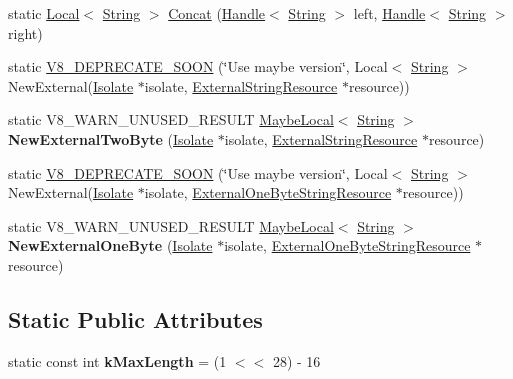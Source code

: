 \begin{DoxyCompactItemize}
\item 
static \hyperlink{classv8_1_1_local}{Local}$<$ \hyperlink{classv8_1_1_string}{String} $>$ \hyperlink{classv8_1_1_string_a3d0b9c9208cf5054adb048e360fb73ff}{Concat} (\hyperlink{classv8_1_1_local}{Handle}$<$ \hyperlink{classv8_1_1_string}{String} $>$ left, \hyperlink{classv8_1_1_local}{Handle}$<$ \hyperlink{classv8_1_1_string}{String} $>$ right)
\item 
static \hyperlink{classv8_1_1_string_affb615b7b4aad75d51d60ed1672a6762}{V8\+\_\+\+D\+E\+P\+R\+E\+C\+A\+T\+E\+\_\+\+S\+O\+O\+N} (\char`\"{}Use maybe version\char`\"{}, Local$<$ \hyperlink{classv8_1_1_string}{String} $>$ New\+External(\hyperlink{classv8_1_1_isolate}{Isolate} $\ast$isolate, \hyperlink{classv8_1_1_string_1_1_external_string_resource}{External\+String\+Resource} $\ast$resource))
\item 
\hypertarget{classv8_1_1_string_ad0491e4a3506df9ef9bfc08fca0d7a34}{}static V8\+\_\+\+W\+A\+R\+N\+\_\+\+U\+N\+U\+S\+E\+D\+\_\+\+R\+E\+S\+U\+L\+T \hyperlink{classv8_1_1_maybe_local}{Maybe\+Local}$<$ \hyperlink{classv8_1_1_string}{String} $>$ {\bfseries New\+External\+Two\+Byte} (\hyperlink{classv8_1_1_isolate}{Isolate} $\ast$isolate, \hyperlink{classv8_1_1_string_1_1_external_string_resource}{External\+String\+Resource} $\ast$resource)\label{classv8_1_1_string_ad0491e4a3506df9ef9bfc08fca0d7a34}

\item 
static \hyperlink{classv8_1_1_string_ad7186b5cfdddffbee8235a7216f31a67}{V8\+\_\+\+D\+E\+P\+R\+E\+C\+A\+T\+E\+\_\+\+S\+O\+O\+N} (\char`\"{}Use maybe version\char`\"{}, Local$<$ \hyperlink{classv8_1_1_string}{String} $>$ New\+External(\hyperlink{classv8_1_1_isolate}{Isolate} $\ast$isolate, \hyperlink{classv8_1_1_string_1_1_external_one_byte_string_resource}{External\+One\+Byte\+String\+Resource} $\ast$resource))
\item 
\hypertarget{classv8_1_1_string_a43edc2bcb1bf2a06f306ea9554042f24}{}static V8\+\_\+\+W\+A\+R\+N\+\_\+\+U\+N\+U\+S\+E\+D\+\_\+\+R\+E\+S\+U\+L\+T \hyperlink{classv8_1_1_maybe_local}{Maybe\+Local}$<$ \hyperlink{classv8_1_1_string}{String} $>$ {\bfseries New\+External\+One\+Byte} (\hyperlink{classv8_1_1_isolate}{Isolate} $\ast$isolate, \hyperlink{classv8_1_1_string_1_1_external_one_byte_string_resource}{External\+One\+Byte\+String\+Resource} $\ast$resource)\label{classv8_1_1_string_a43edc2bcb1bf2a06f306ea9554042f24}

\end{DoxyCompactItemize}
\subsection*{Static Public Attributes}
\begin{DoxyCompactItemize}
\item 
\hypertarget{classv8_1_1_string_a51272e8a71006385863586afb2bb4a62}{}static const int {\bfseries k\+Max\+Length} = (1 $<$$<$ 28) -\/ 16\label{classv8_1_1_string_a51272e8a71006385863586afb2bb4a62}

\end{DoxyCompactItemize}


